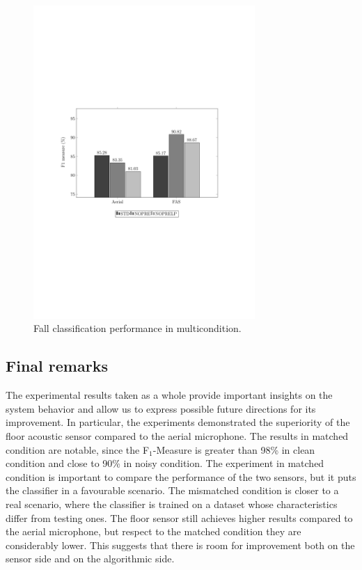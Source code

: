 \begin{figure}[t]
	\centering
	\includegraphics[width=0.75\textwidth]{img/pgfsources/16_multicondition/16_multicondition}
	\caption{Fall classification performance in multicondition.} \label{fig:results_multi}
\end{figure}

\subsection{Final remarks}
The experimental results taken as a whole provide important insights on the system behavior and allow us to express possible future directions for its improvement. In particular, the experiments demonstrated the superiority of the floor acoustic sensor compared to the aerial microphone. The results in matched condition are notable, since the F$_1$-Measure is greater than 98\% in clean condition and close to 90\% in noisy condition. The experiment in matched condition is important to compare the performance of the two sensors, but it puts the classifier in a favourable scenario. The mismatched condition is closer to a real scenario, where the classifier is trained on a dataset whose characteristics differ from testing ones. The floor sensor still achieves higher results compared to the aerial microphone, but respect to the matched condition they are considerably lower. This suggests that there is room for improvement both on the sensor side and on the algorithmic side.

